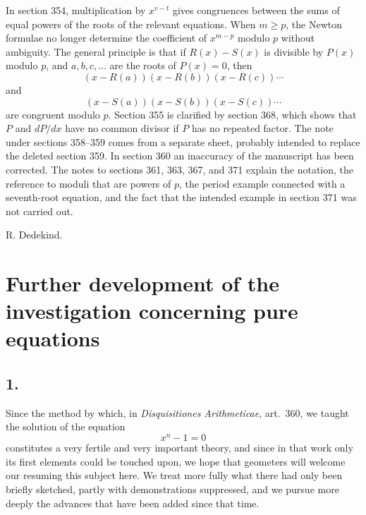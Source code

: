 \documentclass[12pt]{article}
\begin{document}
In section 354, multiplication by $x^{v-t}$ gives congruences between the sums of equal powers of the roots of the relevant equations. When $m\ge p$, the Newton formulae no longer determine the coefficient of $x^{m-p}$ modulo $p$ without ambiguity. The general principle is that if $R(x)-S(x)$ is divisible by $P(x)$ modulo $p$, and $a,b,c,\ldots$ are the roots of $P(x)=0$, then
\[
(x-R(a))(x-R(b))(x-R(c))\cdots
\]
and
\[
(x-S(a))(x-S(b))(x-S(c))\cdots
\]
are congruent modulo $p$. Section 355 is clarified by section 368, which shows that $P$ and $dP/dx$ have no common divisor if $P$ has no repeated factor. The note under sections 358--359 comes from a separate sheet, probably intended to replace the deleted section 359. In section 360 an inaccuracy of the manuscript has been corrected. The notes to sections 361, 363, 367, and 371 explain the notation, the reference to moduli that are powers of $p$, the period example connected with a seventh-root equation, and the fact that the intended example in section 371 was not carried out.

\begin{flushright}
R. Dedekind.
\end{flushright}


\clearpage

\section*{Further development of the investigation concerning pure equations}

\subsection*{1.}

Since the method by which, in \emph{Disquisitiones Arithmeticae}, art.~360, we taught the solution of the equation
\[
x^n-1=0
\]
constitutes a very fertile and very important theory, and since in that work only its first elements could be touched upon, we hope that geometers will welcome our resuming this subject here. We treat more fully what there had only been briefly sketched, partly with demonstrations suppressed, and we pursue more deeply the advances that have been added since that time.
\end{document}
